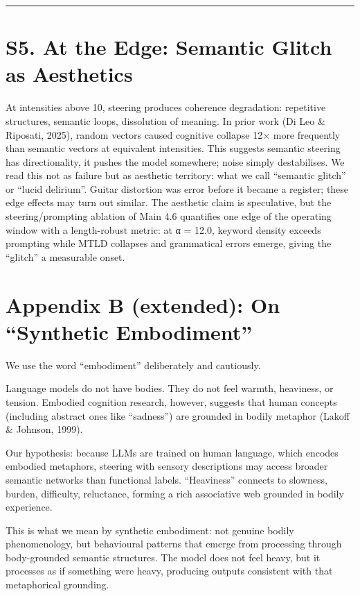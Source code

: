 \documentclass[11pt,a4paper]{article}
\begin{document}
\begin{center}\rule{0.5\linewidth}{0.5pt}\end{center}

\section*{S5. At the Edge: Semantic Glitch as Aesthetics}

At intensities above 10, steering produces coherence degradation: repetitive structures, semantic loops, dissolution of meaning. In prior work (Di Leo \& Riposati, 2025), random vectors caused cognitive collapse 12× more frequently than semantic vectors at equivalent intensities. This suggests semantic steering has directionality, it pushes the model somewhere; noise simply destabilises. We read this not as failure but as aesthetic territory: what we call ``semantic glitch'' or ``lucid delirium''. Guitar distortion was error before it became a register; these edge effects may turn out similar. The aesthetic claim is speculative, but the steering/prompting ablation of Main 4.6 quantifies one edge of the operating window with a length-robust metric: at α = 12.0, keyword density exceeds prompting while MTLD collapses and grammatical errors emerge, giving the ``glitch'' a measurable onset.

\section*{Appendix B (extended): On ``Synthetic Embodiment''}

We use the word ``embodiment'' deliberately and cautiously.

Language models do not have bodies. They do not feel warmth, heaviness, or tension. Embodied cognition research, however, suggests that human concepts (including abstract ones like ``sadness'') are grounded in bodily metaphor (Lakoff \& Johnson, 1999).

Our hypothesis: because LLMs are trained on human language, which encodes embodied metaphors, steering with sensory descriptions may access broader semantic networks than functional labels. ``Heaviness'' connects to slowness, burden, difficulty, reluctance, forming a rich associative web grounded in bodily experience.

This is what we mean by synthetic embodiment: not genuine bodily phenomenology, but behavioural patterns that emerge from processing through body-grounded semantic structures. The model does not feel heavy, but it processes as if something were heavy, producing outputs consistent with that metaphorical grounding.
\end{document}
